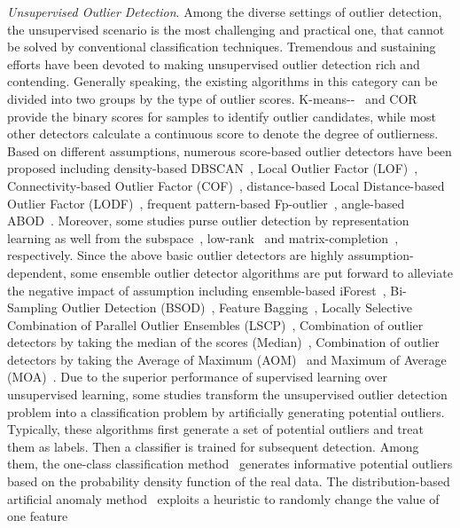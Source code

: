 \documentclass[sigconf,nonacm]{acmart}
\begin{document}
\textit{Unsupervised Outlier Detection}. Among the diverse settings of outlier detection, the unsupervised scenario is the most challenging and practical one, that cannot be solved by conventional classification techniques. Tremendous and sustaining efforts have been devoted to making unsupervised outlier detection rich and contending. Generally speaking, the existing algorithms in this category can be divided into two groups by the type of outlier scores. K-means{-}{-}~\textcolor{gray}{\cite{chawla2013k}} and COR~\textcolor{gray}{\cite{liu2019clustering}} provide the binary scores for samples to identify outlier candidates, while most other detectors calculate a continuous score to denote the degree of outlierness. Based on different assumptions, numerous score-based outlier detectors have been proposed including density-based DBSCAN~\textcolor{gray}{\cite{ester1996density}}, Local Outlier Factor (LOF)~\textcolor{gray}{\cite{Breunig00SIR}}, Connectivity-based Outlier Factor (COF)~\textcolor{gray}{\cite{Tang02PKDD}}, distance-based Local Distance-based Outlier Factor (LODF)~\textcolor{gray}{\cite{Zhang09PKDD}}, frequent pattern-based Fp-outlier~\textcolor{gray}{\cite{he2005fp}}, angle-based ABOD~\textcolor{gray}{\cite{kriegel2008angle,pham2012near}}. Moreover, some studies purse outlier detection by representation learning as well from the subspace~\textcolor{gray}{\cite{10.1007/978-3-642-01307-2_86}}, low-rank~\textcolor{gray}{\cite{zhao2015dual}} and matrix-completion~\textcolor{gray}{\cite{Kannan17SDM}}, respectively. Since the above basic outlier detectors are highly assumption-dependent, some ensemble outlier detector algorithms are put forward to alleviate the negative impact of assumption including ensemble-based iForest~\textcolor{gray}{\cite{LiuFei2008}}, Bi-Sampling Outlier Detection (BSOD)~\textcolor{gray}{\cite{liu2016outlier}}, Feature Bagging~\textcolor{gray}{\cite{lazarevic2005feature}}, Locally Selective Combination of Parallel Outlier Ensembles (LSCP)~\textcolor{gray}{\cite{DBLP:journals/corr/abs-1812-01528}}, Combination of outlier detectors by taking the median of the scores (Median)~\textcolor{gray}{\cite{Aggarwal2015TheoreticalFA}}, Combination of outlier detectors by taking the Average of Maximum (AOM)~\textcolor{gray}{\cite{Aggarwal2015TheoreticalFA}} and Maximum of Average (MOA)~\textcolor{gray}{\cite{Aggarwal2015TheoreticalFA}}. Due to the superior performance of supervised learning over unsupervised learning, some studies transform the unsupervised outlier detection problem into a classification problem by artificially generating potential outliers. Typically, these algorithms first generate a set of potential outliers and treat them as labels. Then a classifier is trained for subsequent detection. Among them, the one-class classification method~\textcolor{gray}{\cite{hempstalk2008one}} generates informative potential outliers based on the probability density function of the real data. The distribution-based artificial anomaly method~\textcolor{gray}{\cite{fan2004using}} exploits a heuristic to randomly change the value of one feature
\end{document}
